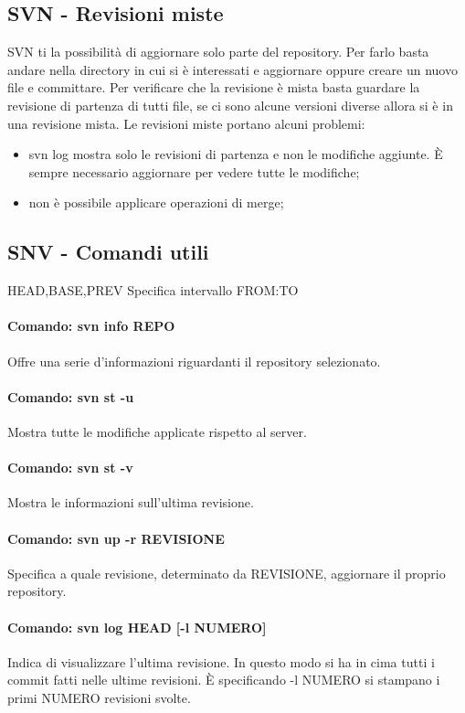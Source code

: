\subsection{SVN - Revisioni miste}
SVN ti la possibilit\`a di aggiornare solo parte del repository. Per farlo basta andare nella directory in cui si \`e interessati e aggiornare oppure creare un nuovo file e committare. \newline
Per verificare che la revisione \`e mista basta guardare la revisione di partenza di tutti file, se ci sono alcune versioni diverse allora si \`e in una revisione mista. \newline
Le revisioni miste portano alcuni problemi:
\begin{itemize}
\item svn log mostra solo le revisioni di partenza e non le modifiche aggiunte. \`E sempre necessario aggiornare per vedere tutte le modifiche;
\item non \`e possibile applicare operazioni di merge;
\end{itemize}

\subsection{SNV - Comandi utili}
HEAD,BASE,PREV \newline
Specifica intervallo FROM:TO \newline

\paragraph{Comando: svn info REPO}
Offre una serie d'informazioni riguardanti il repository selezionato.
\paragraph{Comando: svn st -u}
Mostra tutte le modifiche applicate rispetto al server.
\paragraph{Comando: svn st -v}
Mostra le informazioni sull'ultima revisione.
\paragraph{Comando: svn up -r REVISIONE}
Specifica a quale revisione, determinato da REVISIONE, aggiornare il proprio repository.
\paragraph{Comando: svn log HEAD [-l NUMERO]}
Indica di visualizzare l'ultima revisione. In questo modo si ha in cima tutti i commit fatti nelle ultime revisioni. \`E specificando -l NUMERO si stampano i primi NUMERO revisioni svolte.
